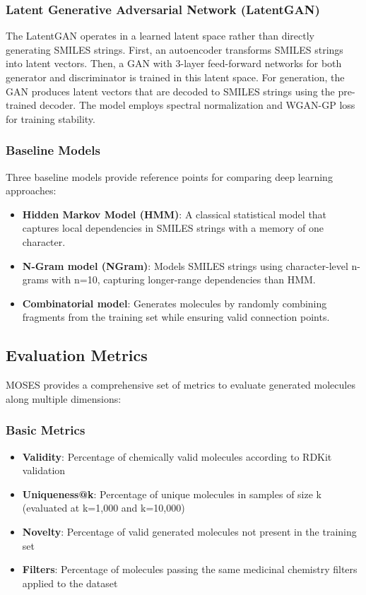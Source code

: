 \documentclass[conference]{IEEEtran}
\begin{document}
\subsubsection{Latent Generative Adversarial Network (LatentGAN)}
The LatentGAN operates in a learned latent space rather than directly generating SMILES strings. First, an autoencoder transforms SMILES strings into latent vectors. Then, a GAN with 3-layer feed-forward networks for both generator and discriminator is trained in this latent space. For generation, the GAN produces latent vectors that are decoded to SMILES strings using the pre-trained decoder. The model employs spectral normalization and WGAN-GP loss for training stability.

\subsubsection{Baseline Models}
Three baseline models provide reference points for comparing deep learning approaches:

\begin{itemize}
    \item \textbf{Hidden Markov Model (HMM)}: A classical statistical model that captures local dependencies in SMILES strings with a memory of one character.
    \item \textbf{N-Gram model (NGram)}: Models SMILES strings using character-level n-grams with n=10, capturing longer-range dependencies than HMM.
    \item \textbf{Combinatorial model}: Generates molecules by randomly combining fragments from the training set while ensuring valid connection points.
\end{itemize}

\subsection{Evaluation Metrics}
MOSES provides a comprehensive set of metrics to evaluate generated molecules along multiple dimensions:

\subsubsection{Basic Metrics}
\begin{itemize}
    \item \textbf{Validity}: Percentage of chemically valid molecules according to RDKit validation
    \item \textbf{Uniqueness@k}: Percentage of unique molecules in samples of size k (evaluated at k=1,000 and k=10,000)
    \item \textbf{Novelty}: Percentage of valid generated molecules not present in the training set
    \item \textbf{Filters}: Percentage of molecules passing the same medicinal chemistry filters applied to the dataset
\end{itemize}
\end{document}
